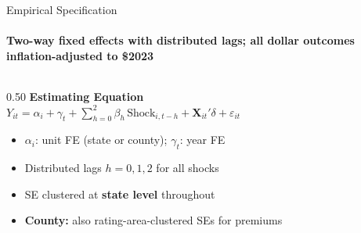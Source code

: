 \documentclass[aspectratio=169,11pt]{beamer}
\newcommand{\emphcolor}[1]{{\color{WarmOrange}\textbf{#1}}}
\newcommand{\tealtext}[1]{{\color{Teal}#1}}
\begin{document}
\begin{frame}[shrink=6]{Empirical Specification}
  \framesubtitle{Two-way fixed effects with distributed lags; all dollar outcomes inflation-adjusted to \$2023}
  \begin{columns}[T]
    \begin{column}{0.50\textwidth}
      \textbf{\tealtext{Estimating Equation}}\\[0.3em]
      \small
      \(Y_{it} = \alpha_i + \gamma_t + \sum_{h=0}^{2}\beta_h \, \text{Shock}_{i,t-h} + \mathbf{X}_{it}'\delta + \varepsilon_{it}\)
      \vspace{0.2em}

      \begin{itemize}\itemsep0.08em
        \item \(\alpha_i\): unit FE (state or county); \(\gamma_t\): year FE
        \item Distributed lags $h = 0, 1, 2$ for all shocks
        \item SE clustered at \emphcolor{state level} throughout
        \item \emphcolor{County:} also rating-area-clustered SEs for premiums
      \end{itemize}
      \vspace{0.15em}


\end{column}
\end{columns}
\end{frame}
\end{document}
